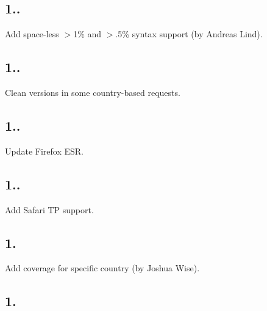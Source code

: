 \subsection*{1..}


\begin{DoxyItemize}
\item Add space-\/less {\ttfamily $>$1\%} and {\ttfamily $>$.5\%} syntax support (by Andreas Lind).
\end{DoxyItemize}

\subsection*{1..}


\begin{DoxyItemize}
\item Clean {} versions in some country-\/based requests.
\end{DoxyItemize}

\subsection*{1..}


\begin{DoxyItemize}
\item Update Firefox E\+SR.
\end{DoxyItemize}

\subsection*{1..}


\begin{DoxyItemize}
\item Add Safari TP support.
\end{DoxyItemize}

\subsection*{1.}


\begin{DoxyItemize}
\item Add coverage for specific country (by Joshua Wise).
\end{DoxyItemize}

\subsection*{1.}


